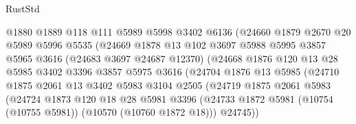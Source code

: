 \begin{lexlean}{RustStd}
\begin{coremodule}
                          @1880
                          @1889
                          @118
                          @111
                          @5989
                          @5998
                          @3402
                          @6136
                          (@24660
                            @1879
                            @2670
                            @20
                            @5989
                            @5996
                            @5535
                            (@24669
                              @1878
                              @13
                              @102
                              @3697
                              @5988
                              @5995
                              @3857
                              @5965
                              @3616
                              (@24683 @3697 @24687 @12370)
                              (@24668
                                @1876
                                @120
                                @13
                                @28
                                @5985
                                @3402
                                @3396
                                @3857
                                @5975
                                @3616
                                (@24704
                                  @1876
                                  @13
                                  @5985
                                  (@24710
                                    @1875
                                    @2061
                                    @13
                                    @3402
                                    @5983
                                    @3104
                                    @2505
                                    (@24719
                                      @1875
                                      @2061
                                      @5983
                                      (@24724
                                        @1873
                                        @120
                                        @18
                                        @28
                                        @5981
                                        @3396
                                        (@24733
                                          @1872
                                          @5981
                                          (@10754 (@10755 @5981))
                                          (@10570 (@10760 @1872 @18)))
                                        @24745))

\end{coremodule}
\end{lexlean}
